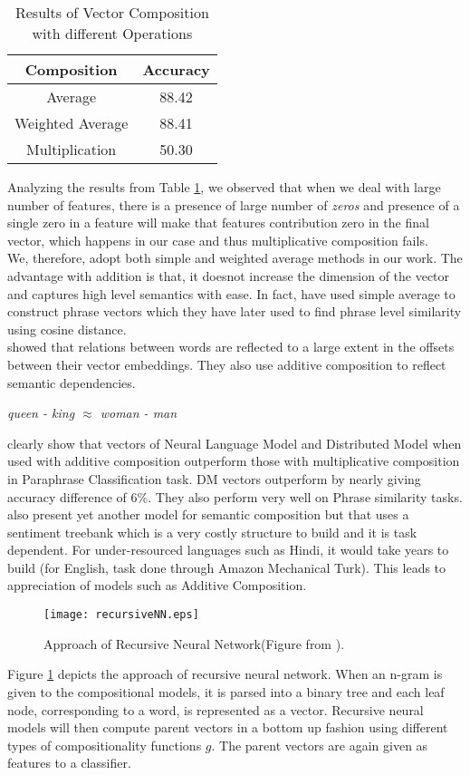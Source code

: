 \begin {table}[h!]
\centering
\begin{tabular}{ |c|c| }
\hline
Composition & Accuracy \\ \hline \hline
Average & 88.42 \\ \hline
Weighted Average & 88.41 \\ \hline
Multiplication & 50.30 \\ \hline
\end{tabular}
\caption {Results of Vector Composition with different Operations}
\label{table:composition}
\end{table}
Analyzing the results from Table \ref{table:composition}, we observed that when we deal with large number of features, there is a presence of large number of \emph{zeros} and presence of a single zero in a feature will make that features contribution zero in the final vector, which happens in our case and thus multiplicative composition fails.\\
We, therefore, adopt both simple and weighted average methods in our work. The advantage with addition is that, it doesnot increase the dimension of the vector and captures high level semantics with ease. In fact, \cite{Zou:13} have used simple average to construct phrase vectors which they have later used to find phrase level similarity using cosine distance.\\
\cite{Mikolov:13c} showed that relations between words are reflected to a large extent in the offsets between their vector embeddings. They also use additive composition to reflect semantic dependencies.
\begin{center}
\emph{queen - king $\approx$ woman - man}
\end{center}
\cite{Blacoe:12} clearly show that vectors of Neural Language Model and Distributed Model when used with additive composition outperform those with multiplicative composition in Paraphrase Classification task. DM vectors outperform by nearly giving accuracy difference of 6\%. They also perform very well on Phrase similarity tasks.\\
\cite{Socher:13} also present yet another model for semantic composition but that uses a sentiment treebank which is a very costly structure to build and it is task dependent. For under-resourced languages such as Hindi, it would take years to build (for English, task done through Amazon Mechanical Turk). This leads to appreciation of models such as Additive Composition.\\
\begin{figure}[H]
\centering
\texttt{[image: recursiveNN.eps]}
\caption{Approach of Recursive Neural Network(Figure from \cite{Socher:13}). \label{fig:recursiveNN}}
\end{figure}
Figure \ref{fig:recursiveNN} depicts the approach of recursive neural network. When an n-gram is given to the compositional models, it is parsed into a binary tree and each leaf node, corresponding to a word, is represented as a vector. Recursive neural models will then  compute parent vectors in a bottom up fashion using different types of compositionality functions $g$. The parent vectors are again given as features to a classifier.

